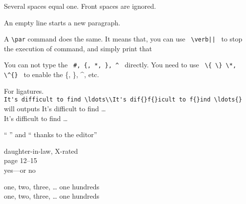 \documentclass{article}
\begin{document}
Several spaces   equal one.
    Front spaces are ignored.

An empty line starts a new
paragraph. \par
A \verb|\par| command does
the same.
It means that, you can use \verb! \verb|| ! to stop the execution of command, and simply print that
\par
You can not type the \verb| #, {, *, }, ^ | directly. You need to use \verb| \{ \} \*, \^{} | to enable the \{, \}, \^{}, etc.
\par
For ligatures.\\
\verb|It's difficult to find \ldots\\It's dif{}f{}icult to f{}ind \ldots{}| \\
will outputs
It's difficult to find \ldots\\
It's dif{}f{}icult to f{}ind \ldots
\par
`` '' and `` thanks to the editor''
\par
daughter-in-law, X-rated \\
page 12--15\\
yes---or no
\par
one, two, three, \ldots{} one hundreds\\
one, two, three, \dots{} one hundreds
\end{document}
